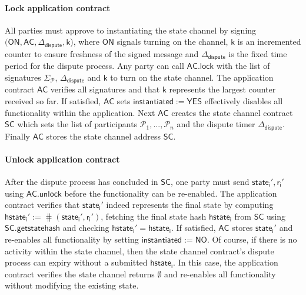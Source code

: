 \documentclass{llncs}
\newcommand{\instantiated}{\mathsf{instantiated}}
\newcommand{\instantiatedno}{\mathsf{NO}}
\newcommand{\instantiatedyes}{\mathsf{YES}}
\newcommand{\chanon}{\mathsf{ON}}
\newcommand{\hstatei}{\mathsf{hstate}_{\monotoniccounter}}
\newcommand{\monotoniccounter}{\mathsf{i}}
\newcommand{\stateinfoi}{\mathsf{state}_{\mathsf{i}}}
\newcommand{\participant}{\mathcal{P}}
\newcommand{\rani}{\mathsf{r}_{\mathsf{i}}}
\newcommand{\statechannel}{\mathsf{SC}}
\newcommand{\statechannelgetcommitment}{\mathsf{SC}.\mathsf{getstatehash}}
\newcommand{\appcontract}{\mathsf{AC}}
\newcommand{\applock}{\mathsf{AC.lock}}
\newcommand{\appunlock}{\mathsf{AC.unlock}}
\newcommand{\timerdispute}{\mathsf{\Delta}_{\mathsf{dispute}}}
\begin{document}


 
\paragraph{Lock application contract} All parties must approve to instantiating the state channel by signing $(\chanon, \appcontract, \timerdispute, \mathsf{k}$), where $\chanon$ signals turning on the channel, $\mathsf{k}$ is an incremented counter to ensure freshness of the signed message and $\timerdispute$ is the fixed time period for the dispute process. 
Any party can call $\applock$ with the list of signatures $\Sigma_{\participant}$, $\timerdispute$ and $\mathsf{k}$ to turn on the state channel. 
The application contract $\appcontract$ verifies all signatures and that $\mathsf{k}$ represents the largest counter received so far.
If satisfied, $\appcontract$ sets  $\instantiated := \instantiatedyes$ effectively disables all functionality within the application.
Next $\appcontract$ creates the state channel contract $\statechannel$ which sets the list of participants $\participant_{1},...,\participant_{n}$ and the dispute timer $\timerdispute$. 
Finally $\appcontract$ stores the state channel address $\statechannel$. 
 

\paragraph{Unlock application contract}

After the dispute process has concluded in $\statechannel$, one party must send  $\stateinfoi',\rani'$ using $\appunlock$ before the functionality can be re-enabled.
The application contract verifies that $\stateinfoi'$  indeed represents the final state by computing $\hstatei' := \hash(\stateinfoi', \rani')$, fetching the final state hash $\hstatei$ from $\statechannel$ using $\statechannelgetcommitment$ and checking  $\hstatei' = \hstatei$. 
If satisfied, $\appcontract$ stores $\stateinfoi'$ and re-enables all functionality by setting $\instantiated :=  \instantiatedno$. 
Of course, if there is no activity within the state channel, then the state channel contract's dispute process can expiry without a submitted $\hstatei$.
In this case, the application contract verifies the state channel returns $\emptyset$ and re-enables all functionality without modifying the existing state. 
\end{document}
